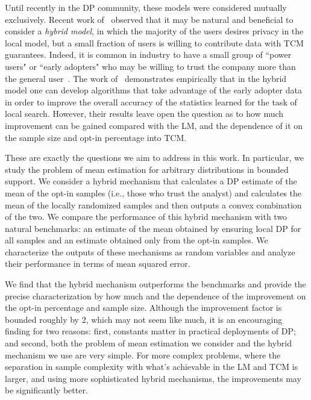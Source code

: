 \documentclass{article}
\theoremstyle{plain}
\begin{document}
Until recently in the DP community, these models were considered mutually exclusively. Recent work of~\cite{blender} observed that it may be natural and beneficial to consider a \textit{hybrid model}, in which the majority of the users desires privacy in the local model, but a small fraction of users is willing to contribute data with TCM guarantees. Indeed, it is common in industry to have a small group of ``power users" or ``early adopters" who may be willing to trust the company more than the general user~\cite{microsoft-opt-in}. %
The work of~\cite{blender} demonstrates empirically that in the hybrid model one can develop algorithms that take advantage of the early adopter data in order to improve the overall accuracy of the statistics learned for the task of local search. However, their results leave open the question as to how much improvement can be gained compared with the LM, and the dependence of it on the sample size and opt-in percentage into TCM.

These are exactly the questions we aim to address in this work. In particular, we study the problem of mean estimation for arbitrary distributions in bounded support. We consider a hybrid mechanism that calculates a DP estimate of the mean of the opt-in samples (i.e., those who trust the analyst) and calculates the mean of the locally randomized samples and then outputs a convex combination of the two. We compare the performance of this hybrid mechanism with two natural benchmarks: an estimate of the mean obtained by ensuring local DP for all samples and an estimate obtained only from the opt-in samples. We characterize the outputs of these mechanisms as random variables and analyze their performance in terms of mean squared error.

We find that the hybrid mechanism outperforms the benchmarks and provide the precise characterization by how much and the dependence of the improvement on the opt-in percentage and sample size. Although the improvement factor is bounded roughly by 2, which may not seem like much, it is an encouraging finding for two reasons: first, constants matter in practical deployments of DP; and second, both the problem of mean estimation we consider and the hybrid mechanism we use are very simple. For more complex problems, where the separation in sample complexity with what's achievable in the LM and TCM is larger, and using more sophisticated hybrid mechanisms, the improvements may be significantly better. 
\end{document}
